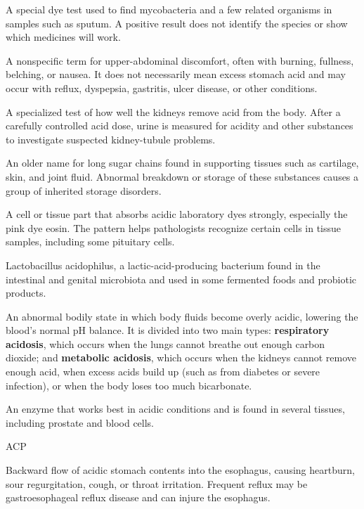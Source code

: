  A special dye test used to find mycobacteria and a few related organisms in samples such as sputum. A positive result does not identify the species or show which medicines will work.

 A nonspecific term for upper-abdominal discomfort, often with burning, fullness, belching, or nausea. It does not necessarily mean excess stomach acid and may occur with reflux, dyspepsia, gastritis, ulcer disease, or other conditions.

 A specialized test of how well the kidneys remove acid from the body. After a carefully controlled acid dose, urine is measured for acidity and other substances to investigate suspected kidney-tubule problems.

 An older name for long sugar chains found in supporting tissues such as cartilage, skin, and joint fluid. Abnormal breakdown or storage of these substances causes a group of inherited storage disorders.

 A cell or tissue part that absorbs acidic laboratory dyes strongly, especially the pink dye eosin. The pattern helps pathologists recognize certain cells in tissue samples, including some pituitary cells.

 Lactobacillus acidophilus, a lactic-acid-producing bacterium found in the intestinal and genital microbiota and used in some fermented foods and probiotic products.

 An abnormal bodily state in which body fluids become overly acidic, lowering the blood's normal pH balance. It is divided into two main types: \textbf{respiratory acidosis}, which occurs when the lungs cannot breathe out enough carbon dioxide; and \textbf{metabolic acidosis}, which occurs when the kidneys cannot remove enough acid, when excess acids build up (such as from diabetes or severe infection), or when the body loses too much bicarbonate.

 An enzyme that works best in acidic conditions and is found in several tissues, including prostate and blood cells.

\synonyms
ACP

 Backward flow of acidic stomach contents into the esophagus, causing heartburn, sour regurgitation, cough, or throat irritation. Frequent reflux may be gastroesophageal reflux disease and can injure the esophagus.

